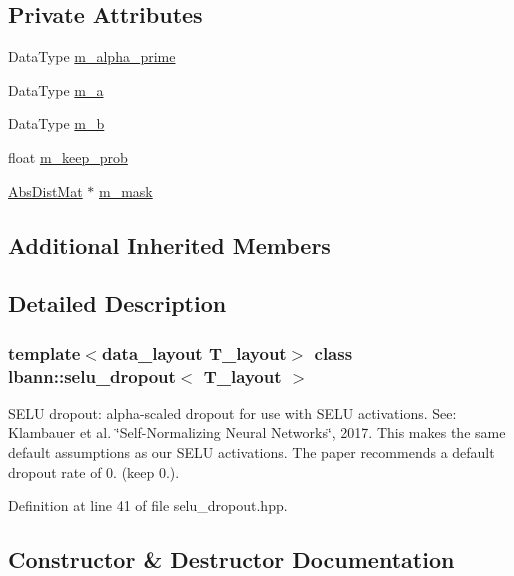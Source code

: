 \subsection*{Private Attributes}
\begin{DoxyCompactItemize}
\item 
Data\+Type \hyperlink{classlbann_1_1selu__dropout_a8db065b13d8737e1bd4cf154ab3fe666}{m\+\_\+alpha\+\_\+prime}
\item 
Data\+Type \hyperlink{classlbann_1_1selu__dropout_a52bd21583da68ba4e8a374fab259a3ef}{m\+\_\+a}
\item 
Data\+Type \hyperlink{classlbann_1_1selu__dropout_a456fa501b7df6b52701c1aa3639ebc42}{m\+\_\+b}
\item 
float \hyperlink{classlbann_1_1selu__dropout_a00bd2a07703e2e918af8ae68b58ff11b}{m\+\_\+keep\+\_\+prob}
\item 
\hyperlink{base_8hpp_a9a697a504ae84010e7439ffec862b470}{Abs\+Dist\+Mat} $\ast$ \hyperlink{classlbann_1_1selu__dropout_a31aaadbc51d78673a84390b48d4e5950}{m\+\_\+mask}
\end{DoxyCompactItemize}
\subsection*{Additional Inherited Members}


\subsection{Detailed Description}
\subsubsection*{template$<$data\+\_\+layout T\+\_\+layout$>$\newline
class lbann\+::selu\+\_\+dropout$<$ T\+\_\+layout $>$}

S\+E\+LU dropout\+: alpha-\/scaled dropout for use with S\+E\+LU activations. See\+: Klambauer et al. \char`\"{}\+Self-\/\+Normalizing Neural Networks\char`\"{}, 2017. This makes the same default assumptions as our S\+E\+LU activations. The paper recommends a default dropout rate of 0. (keep 0.). 

Definition at line 41 of file selu\+\_\+dropout.\+hpp.



\subsection{Constructor \& Destructor Documentation}
\mbox{\label{classlbann_1_1selu__dropout_a988a7e6b7b85ef8ba08a2bc52537e6d3}} 
